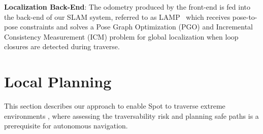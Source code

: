 \documentclass[letterpaper, 10pt, conference]{ieeeconf}      %
\newcommand{\ph}[1]{{\textbf{#1}:}} %
\newcommand{\rev}[1]{{\color{blue} #1 }} %
\begin{document}
{%

}



\rev{\ph{Localization Back-End} The odometry produced by the front-end is fed into the back-end of our SLAM system, referred to as LAMP~\cite{Ebadi2020} which receives pose-to-pose constraints and solves a Pose Graph Optimization (PGO) and Incremental Consistency Measurement (ICM) problem for global localization when loop closures are detected during traverse.}



\section{Local Planning}\label{sec:local_planning}
This section describes our approach to enable Spot to traverse \rev{extreme environments}, where assessing the traversability risk and planning safe paths is a prerequisite for autonomous navigation.

\end{document}
